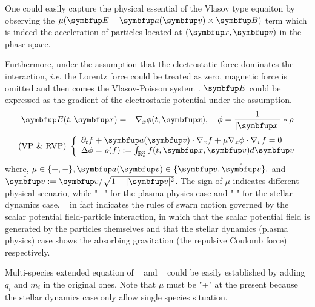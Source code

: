 One could easily capture the physical essential of the Vlasov type equaiton by observing the $\mu(\vE+\vect{a}(\vv) \times \vB)$ term which is indeed the acceleration of particles located at $(\vx,\vv)$ in the phase space.


Furthermore, under the assumption that the electrostatic force dominates the interaction, \textit{i.e.} the Lorentz force could be treated as zero, magnetic force is omitted and then comes the Vlasov-Poisson system \eqvp. $\vE$ could be expressed as the gradient of the electrostatic potential under the assumption.
\begin{equation}
    \vE(t, \vx)=-\nabla_{x} \phi(t, \vx), \quad \phi= \frac{1}{|\vx|} *\rho 
\end{equation}
\begin{equation}
    \label{eq:vp}
    \text { (VP \& RVP) }\left\{\begin{array}{l}
    \partial_{t} f+\vect{a}(\vv ) \cdot \nabla_{x} f+\mu \nabla_{x} \phi \cdot \nabla_{v} f=0 \\
    \Delta \phi=\rho(f):=\int_{\bbRv} \ftxv d \vv
\end{array}\right.\end{equation}
where, $\mu \in\{+,-\}, \vect{a}(\vv) \in\{\vv, \hat{\vv}\},$ and $\hat{\vv}:=\vv / \sqrt{1+|\vv|^{2}}$. The sign of $\mu$ indicates different physical scenario, while "+" for the plasma physics case and "-" for the stellar dynamics case. \eqvp~ in fact indicates the rules of swarn motion governed by the scalar potential field-particle interaction, in which that the scalar potential field is generated by the particles themselves and that the stellar dynamics (plasma physics) case shows the absorbing gravitation (the repulsive Coulomb force) respectively. 


Multi-species extended equation of \eqvp~ and \eqrvp~ could be easily established by adding $q_i$ and $m_i$ in the original ones. Note that $\mu$ must be "+" at the present because the stellar dynamics case only allow single species situation. 

